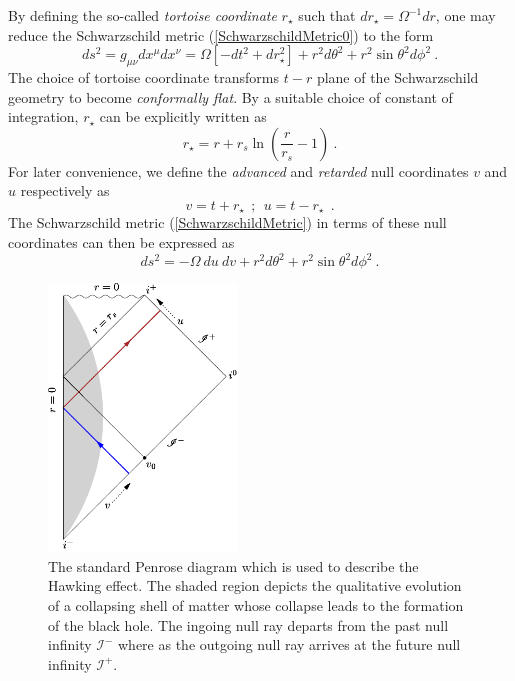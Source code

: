 \documentclass[aps,12pt,showpacs]{revtex4-2}
\def\rstar{r_{\star}}
\def\scriplus{\mathscr{I}^{+}}
\def\scriminus{\mathscr{I}^{-}}
\begin{document}
%
By defining the so-called \emph{tortoise coordinate} $\rstar$ such that $d\rstar 
= \Omega^{-1} dr$, one may reduce the Schwarzschild metric 
(\ref{SchwarzschildMetric0}) to the form
%
\begin{equation}\label{SchwarzschildMetric}
ds^2 = g_{\mu\nu}dx^{\mu}dx^{\nu} =  \Omega \left[ - dt^2 + d\rstar^2 \right] 
  + r^2 d\theta^2 + r^2 \sin\theta^2 d\phi^2 ~. 
\end{equation}
% 
The choice of tortoise coordinate transforms $t-r$ plane of the
Schwarzschild geometry to become \emph{conformally flat}. By a suitable 
choice of constant of integration, $\rstar$ can be explicitly written as
%
\begin{equation}\label{TortoiseCoordinate}
\rstar = r + r_s \ln \left(\frac{r}{r_{s}}-1\right)  ~.
\end{equation}
%
For later convenience, we define the \emph{advanced} and \emph{retarded} null 
coordinates $v$ and $u$ respectively as
%
\begin{equation}\label{AdvancedRetardedNullCoordinates}
v = t + \rstar  ~~;~~  u = t - \rstar ~~.
\end{equation}
%
The Schwarzschild metric (\ref{SchwarzschildMetric}) in terms of these null 
coordinates can then be expressed as
%
\begin{equation}\label{SchwarzschildMetricNullCoordinates}
ds^2 =  - \Omega~ du~ dv + r^2 d\theta^2 + r^2 \sin\theta^2 
d\phi^2 ~. 
\end{equation}
% 



\begin{figure}
\includegraphics[width=5cm]{penrose-collapse.pdf}
\caption{The standard Penrose diagram which is used to describe the Hawking 
effect. The shaded region depicts the qualitative evolution of a collapsing 
shell of matter whose collapse leads to the formation of the black hole. The 
ingoing null ray departs from the past null infinity $\scriminus$ where as the 
outgoing null ray arrives at the future null infinity $\scriplus$. }
\label{fig:BHPenroseDiagram} 
\end{figure}
\end{document}
